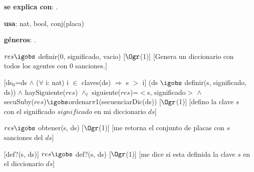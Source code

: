\begin{Interfaz}

	\textbf{se explica con}: .

	\textbf{usa}: nat, bool, conj(placa)

	\textbf{géneros}: .


	{$res \igobs$ definir($0$, significado, vacio)}
	[$\Ogr$(1)]
	[Genera un diccionario con todos los agentes con $0$ sanciones.]

	[ds$_0$=ds $\land$ ($\forall$ i: nat) i $\in$ claves(ds) $\Rightarrow$ s $>$ i]
	{(ds $\igobs$ definir(s, significado, ds)) $\land$ haySiguiente($res$) $\land_l$ siguiente($res$)=$<$s, significado$>$ $\land$\\
	secuSuby($res$)$\igobs$ordenar$\pi$1(secuenciarDic(ds))}%
	[$\Ogr$(1)]
	[defino la clave $s$ con el significado $significado$ en mi diccionario $ds$]
	
	{$res \igobs$ obtener(s, ds)}
	[$\Ogr$(1)]
	[me retorna el conjunto de placas con $s$ sanciones del $ds$]

	[def?(s, ds)]
	{$res \igobs$ def?(s, ds)}  
	[$\Ogr$(1)]
	[me dice si esta definida la clave $s$ en el diccionario $ds$]
	
\end{Interfaz}

